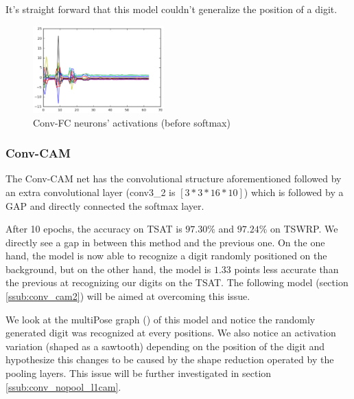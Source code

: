 				\begin{mdframed}[backgroundcolor = gray!30]
					It's straight forward that this model couldn't generalize the position of a digit.
				\end{mdframed}

				\begin{figure}[h]
					\centering
					\includegraphics[width=0.45\textwidth]{images/multiPosGraphConvFC}
					\caption{Conv-FC neurons' activations (before softmax)}
					\label{fig:multipose_graph_fc}
				\end{figure}

			\subsubsection{Conv-CAM}
			\label{ssub:conv_cam}
				The Conv-CAM net has the convolutional structure aforementioned followed by an extra convolutional layer (conv3\_2 is $[3*3*16*10]$) which is followed by a GAP and directly connected the softmax layer.

				After 10 epochs, the accuracy on TSAT is $97.30\%$ and $97.24\%$ on TSWRP. We directly see a gap in between this method and the previous one. On the one hand, the model is now able to recognize a digit randomly positioned on the background, but on the other hand, the model is $1.33$ points less accurate than the previous at recognizing our digits on the TSAT. The following model (section \ref{ssub:conv_cam2}) will be aimed at overcoming this issue.

				\begin{mdframed}[backgroundcolor = gray!30]
					We look at the multiPose graph () of this model and notice the randomly generated digit was recognized at every positions. We also notice an activation variation (shaped as a sawtooth) depending on the position of the digit and hypothesize this changes to be caused by the shape reduction operated by the pooling layers. This issue will be further investigated in section \ref{ssub:conv_nopool_l1cam}.
				\end{mdframed}

